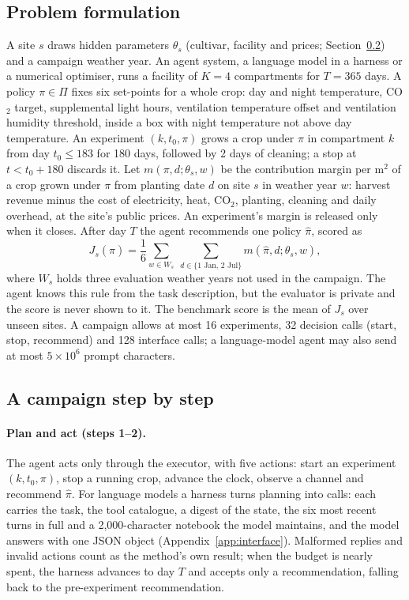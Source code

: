 \subsection{Problem formulation}
\label{sec:formal}
A site $s$ draws hidden parameters $\theta_s$ (cultivar, facility and prices; Section~\ref{sec:steps}) and a campaign weather year. An agent system, a language model in a harness or a numerical optimiser, runs a facility of $K=4$ compartments for $T=365$ days. A policy $\pi\in\Pi$ fixes six set-points for a whole crop: day and night temperature, CO$_2$ target, supplemental light hours, ventilation temperature offset and ventilation humidity threshold, inside a box with night temperature not above day temperature. An experiment $(k,t_0,\pi)$ grows a crop under $\pi$ in compartment $k$ from day $t_0\le 183$ for 180 days, followed by 2 days of cleaning; a stop at $t<t_0+180$ discards it. Let $m(\pi,d;\theta_s,w)$ be the contribution margin per m$^2$ of a crop grown under $\pi$ from planting date $d$ on site $s$ in weather year $w$: harvest revenue minus the cost of electricity, heat, CO$_2$, planting, cleaning and daily overhead, at the site's public prices. An experiment's margin is released only when it closes. After day $T$ the agent recommends one policy $\hat\pi$, scored as
\[
J_s(\hat\pi)=\frac{1}{6}\sum_{w\in W_s}\ \sum_{d\in\{\text{1 Jan},\,\text{2 Jul}\}} m\!\left(\hat\pi,d;\theta_s,w\right),
\]
where $W_s$ holds three evaluation weather years not used in the campaign. The agent knows this rule from the task description, but the evaluator is private and the score is never shown to it. The benchmark score is the mean of $J_s$ over unseen sites. A campaign allows at most 16 experiments, 32 decision calls (start, stop, recommend) and 128 interface calls; a language-model agent may also send at most $5\times10^6$ prompt characters.

\subsection{A campaign step by step}
\label{sec:steps}
\label{sec:env}
\label{sec:interface}
\paragraph{Plan and act (steps 1--2).} The agent acts only through the executor, with five actions: start an experiment $(k,t_0,\pi)$, stop a running crop, advance the clock, observe a channel and recommend $\hat\pi$. For language models a harness turns planning into calls: each carries the task, the tool catalogue, a digest of the state, the six most recent turns in full and a 2{,}000-character notebook the model maintains, and the model answers with one JSON object (Appendix~\ref{app:interface}). Malformed replies and invalid actions count as the method's own result; when the budget is nearly spent, the harness advances to day $T$ and accepts only a recommendation, falling back to the pre-experiment recommendation.

